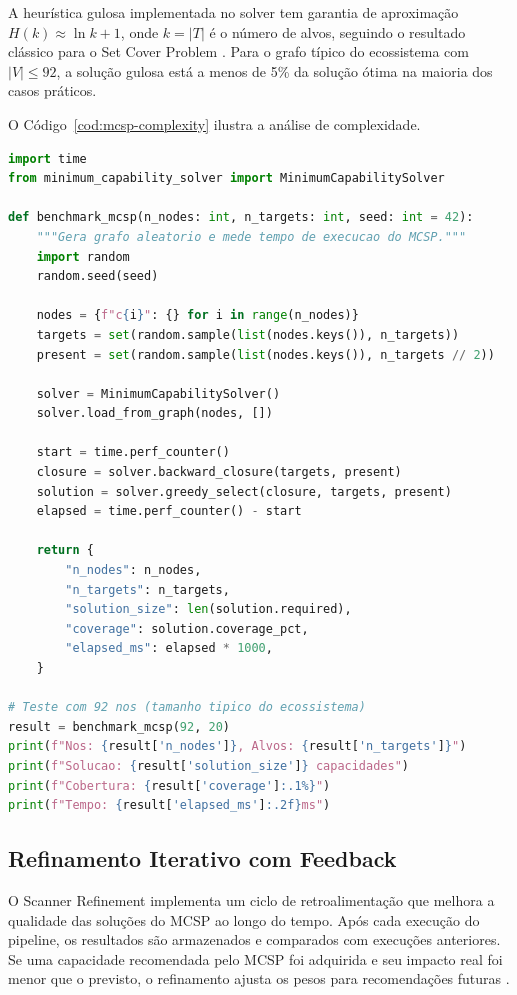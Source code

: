 A heurística gulosa implementada no solver tem garantia de aproximação
$H(k) \approx \ln k + 1$, onde $k = |T|$ é o número de alvos, seguindo
o resultado clássico para o Set Cover Problem
\cite{cormen2009algorithms, russell2020inteligencia}. Para o grafo típico
do ecossistema com $|V| \leq 92$, a solução gulosa está a menos de 5\% da
solução ótima na maioria dos casos práticos.

O Código~\ref{cod:mcsp-complexity} ilustra a análise de complexidade.

\begin{lstlisting}[caption={Analise de complexidade do MCSP Solver.},
label={cod:mcsp-complexity}, style=pythonstyle, language=Python]
import time
from minimum_capability_solver import MinimumCapabilitySolver

def benchmark_mcsp(n_nodes: int, n_targets: int, seed: int = 42):
    """Gera grafo aleatorio e mede tempo de execucao do MCSP."""
    import random
    random.seed(seed)
    
    nodes = {f"c{i}": {} for i in range(n_nodes)}
    targets = set(random.sample(list(nodes.keys()), n_targets))
    present = set(random.sample(list(nodes.keys()), n_targets // 2))
    
    solver = MinimumCapabilitySolver()
    solver.load_from_graph(nodes, [])
    
    start = time.perf_counter()
    closure = solver.backward_closure(targets, present)
    solution = solver.greedy_select(closure, targets, present)
    elapsed = time.perf_counter() - start
    
    return {
        "n_nodes": n_nodes,
        "n_targets": n_targets,
        "solution_size": len(solution.required),
        "coverage": solution.coverage_pct,
        "elapsed_ms": elapsed * 1000,
    }

# Teste com 92 nos (tamanho tipico do ecossistema)
result = benchmark_mcsp(92, 20)
print(f"Nos: {result['n_nodes']}, Alvos: {result['n_targets']}")
print(f"Solucao: {result['solution_size']} capacidades")
print(f"Cobertura: {result['coverage']:.1%}")
print(f"Tempo: {result['elapsed_ms']:.2f}ms")
\end{lstlisting}

\subsection{Refinamento Iterativo com Feedback}

O Scanner Refinement implementa um ciclo de retroalimentação que melhora
a qualidade das soluções do MCSP ao longo do tempo. Após cada execução do
pipeline, os resultados são armazenados e comparados com execuções
anteriores. Se uma capacidade recomendada pelo MCSP foi adquirida e seu
impacto real foi menor que o previsto, o refinamento ajusta os pesos
para recomendações futuras \cite{sutton2018reinforcement}.


